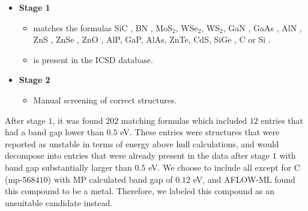 \begin{itemize}
  \item[]{\textbf{Stage 1}}
  \begin{itemize}
  \item matches the formulas SiC \cite{Neudeck1995, Weber2010, Son2020, Falk2013, Martienssen2005}, BN \cite{Toth2019, Atatuere2018}, MoS$_2$\cite{Atatuere2018}, WSe$_2$\cite{Atatuere2018}, WS$_2$\cite{Atatuere2018}, GaN \cite{Berhane2018}, GaAs \cite{Wang2014}, AlN \cite{Weber2010, Xue2020}, ZnS \cite{Zhang2020}, ZnSe \cite{Weber2010}, ZnO \cite{Zhang2020}, AlP\cite{Weber2010}, GaP\cite{Weber2010}, AlAs\cite{Weber2010}, ZnTe\cite{Weber2010}, CdS\cite{Weber2010}, SiGe \cite{Hardy2019}, C \cite{Taylor2008, Barclay2011, Gordon2013} or Si \cite{Redjem2020, Zhang2020}.
  \item is present in the ICSD database.
  \end{itemize}
  \item[]{\textbf{Stage 2}}
  \begin{itemize}
  \item Manual screening of correct structures.
  \end{itemize}
\end{itemize}

After stage $1$, it was found $202$ matching formulas which included $12$ entries that had a band gap lower than $0.5$ eV. These entries were structures that were reported as unstable in terms of energy above hull calculations, and would decompose into entries that were already present in the data after stage $1$ with band gap substantially larger than $0.5$ eV. We choose to include all except for C (mp-$568410$) with MP calculated band gap of $0.12$ eV, and AFLOW-ML found this compound to be a metal. Therefore, we labeled this compound as an unsuitable candidate instead.





